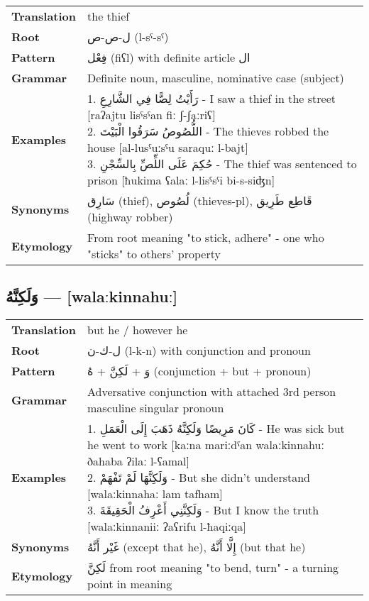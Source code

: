 \documentclass[letterpaper,12pt]{article}
\begin{document}
\begin{tabular}{p{3cm}p{10cm}}
\toprule
\textbf{Translation} & the thief \\
\textbf{Root} & \textarabic{ل-ص-ص} (l-sˤ-sˤ) \\
\textbf{Pattern} & \textarabic{فِعْل} (fiʕl) with definite article \textarabic{ال} \\
\textbf{Grammar} & Definite noun, masculine, nominative case (subject) \\
\textbf{Examples} & \makecell[l]{\parbox{9.5cm}{
1. \textarabic{رَأَيْتُ لِصًّا فِي الشَّارِعِ} - I saw a thief in the street [raʔajtu lisˤsˤan fiː ʃ-ʃaːriʕ]\\
2. \textarabic{اللُّصُوصُ سَرَقُوا الْبَيْتَ} - The thieves robbed the house [al-lusˤuːsˤu saraquː l-bajt]\\
3. \textarabic{حُكِمَ عَلَى اللِّصِّ بِالسِّجْنِ} - The thief was sentenced to prison [ħukima ʕalaː l-lisˤsˤi bi-s-siʤn]
}} \\
\midrule
\textbf{Synonyms} & \textarabic{سَارِق} (thief), \textarabic{لُصُوص} (thieves-pl), \textarabic{قَاطِع طَرِيق} (highway robber) \\
\textbf{Etymology} & From root meaning "to stick, adhere" - one who "sticks" to others' property \\
\bottomrule
\end{tabular}

\subsection{\textarabic{وَلَكِنَّهُ} — [walaːkinnahuː]}

\begin{tabular}{p{3cm}p{10cm}}
\toprule
\textbf{Translation} & but he / however he \\
\textbf{Root} & \textarabic{ل-ك-ن} (l-k-n) with conjunction and pronoun \\
\textbf{Pattern} & \textarabic{وَ} + \textarabic{لَكِنَّ} + \textarabic{هُ} (conjunction + but + pronoun) \\
\textbf{Grammar} & Adversative conjunction with attached 3rd person masculine singular pronoun \\
\textbf{Examples} & \makecell[l]{\parbox{9.5cm}{
1. \textarabic{كَانَ مَرِيضًا وَلَكِنَّهُ ذَهَبَ إِلَى الْعَمَلِ} - He was sick but he went to work [kaːna mariːdˤan walaːkinnahuː ðahaba ʔilaː l-ʕamal]\\
2. \textarabic{وَلَكِنَّهَا لَمْ تَفْهَمْ} - But she didn't understand [walaːkinnahaː lam tafham]\\
3. \textarabic{وَلَكِنَّنِي أَعْرِفُ الْحَقِيقَةَ} - But I know the truth [walaːkinnaniiː ʔaʕrifu l-ħaqiːqa]
}} \\
\midrule
\textbf{Synonyms} & \textarabic{غَيْر أَنَّهُ} (except that he), \textarabic{إِلَّا أَنَّهُ} (but that he) \\
\textbf{Etymology} & \textarabic{لَكِنَّ} from root meaning "to bend, turn" - a turning point in meaning \\
\bottomrule
\end{tabular}
\end{document}
